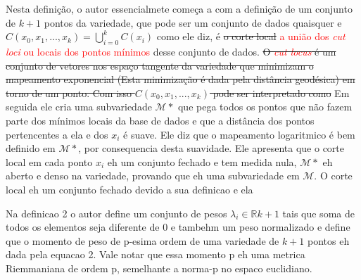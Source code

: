 \documentclass[a4paper,titlepage]{article}
\newcommand{\juliana}[1]{\textcolor{red}{#1}}
\begin{document}
Nesta definição, o autor essencialmete começa a com a definição de um conjunto de $k+1$ pontos da variedade, que pode ser um conjunto de dados quaisquer e $C(x_0,x_1,...,x_k) =\bigcup_{i=0}^{k} C(x_i)$ como ele diz, é \sout{o corte local} \juliana{a união dos \textit{cut loci} ou locais dos pontos mínimos} desse conjunto de dados.
\sout{O \juliana{\textit{cut locus}} é um conjunto de vetores nos espaço tangente da variedade que minimizam o mapeamento exponencial (Esta minimização é dada pela distância geodésica) em torno de um ponto. Com isso $C(x_0,x_1,...,x_k)$ pode ser interpretado como}
Em seguida ele cria uma subvariedade $\mathcal{M}{*}$ que pega todos os pontos que não fazem parte dos mínimos locais da base de dados e que a distância dos pontos pertencentes a ela e dos $x_i$ é suave. Ele diz que o mapeamento logaritmico é bem definido em $\mathcal{M}{*}$, por consequencia desta suavidade. Ele apresenta que o corte local em cada ponto $x_i$ eh um conjunto fechado e tem medida nula, $\mathcal{M}{*}$ eh aberto e denso na variedade, provando que eh uma subvariedade em $\mathcal{M}$. O corte local eh um conjunto fechado devido a sua definicao e ela  

\vspace{1em}
\vspace{1em}

Na definicao 2 o autor define um conjunto de pesos $\lambda_i \in \mathbb{R}{k+1}$ tais que soma de todos os elementos seja diferente de 0 e tambehm um peso normalizado e define que o momento de peso de p-esima ordem de uma variedade de $k+1$ pontos eh dada pela equacao 2. Vale notar que essa momento p eh uma metrica Riemmaniana de ordem p, semelhante a norma-p no espaco euclidiano.
\begin{center}
\end{center}
\end{document}
